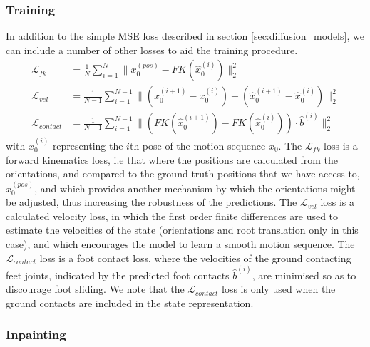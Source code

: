 \subsubsection{Training}
In addition to the simple MSE loss described in section \ref{sec:diffusion_models}, we can include a number of other losses to aid the training procedure.
\begin{equation}
    \begin{aligned}
        \mathcal{L}_{fk} &= \frac{1}{N} \sum_{i=1}^{N} \| x_0^{(pos)} - FK(\hat{x}_0^{(i)})  \|_2^2 \\
        \mathcal{L}_{vel} &= \frac{1}{N-1} \sum_{i=1}^{N-1} \| (x_0^{(i+1)} - x_0^{(i)}) - (\hat{x}_0^{(i+1)} - \hat{x}_0^{(i)}) \|_2^2 \\
        \mathcal{L}_{contact} &= \frac{1}{N-1} \sum_{i=1}^{N-1} \| \left( FK(\hat{x}_0^{(i+1)}) - FK(\hat{x}_0^{(i)}) \right) \cdot \hat{b}^{(i)}  \|_2^2
    \end{aligned}
\end{equation}
with $x_0^{(i)}$ representing the $i$th pose of the motion sequence $x_0$. The $\mathcal{L}_{fk}$ loss is a forward kinematics loss, i.e that where the positions are calculated from the orientations, and compared to the ground truth positions that we have access to, $x_0^{(pos)}$, and which provides another mechanism by which the orientations might be adjusted, thus increasing the robustness of the predictions. The $\mathcal{L}_{vel}$ loss is a calculated velocity loss, in which the first order finite differences are used to estimate the velocities of the state (orientations and root translation only in this case), and which encourages the model to learn a smooth motion sequence. The $\mathcal{L}_{contact}$ loss is a foot contact loss, where the velocities of the ground contacting feet joints, indicated by the predicted foot contacts $\hat{b}^{(i)}$, are minimised so as to discourage foot sliding. We note that the $\mathcal{L}_{contact}$ loss is only used when the ground contacts are included in the state representation.



\subsubsection{Inpainting}
\label{sec:diffusion_method_inpainting}

